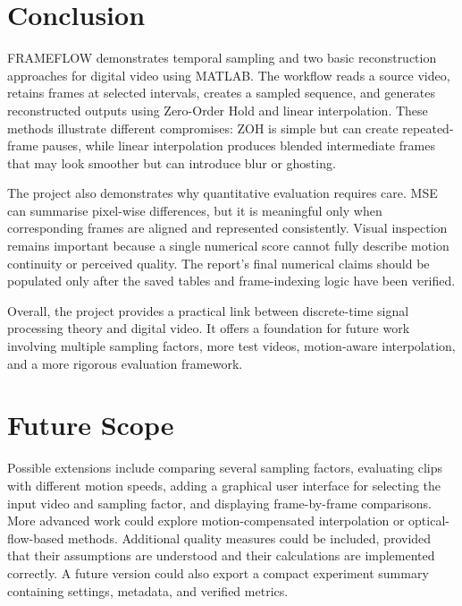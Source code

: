 \documentclass[12pt,a4paper,oneside]{report}
\begin{document}
\chapter{Conclusion}
FRAMEFLOW demonstrates temporal sampling and two basic reconstruction approaches for digital video using MATLAB. The workflow reads a source video, retains frames at selected intervals, creates a sampled sequence, and generates reconstructed outputs using Zero-Order Hold and linear interpolation. These methods illustrate different compromises: ZOH is simple but can create repeated-frame pauses, while linear interpolation produces blended intermediate frames that may look smoother but can introduce blur or ghosting.

The project also demonstrates why quantitative evaluation requires care. MSE can summarise pixel-wise differences, but it is meaningful only when corresponding frames are aligned and represented consistently. Visual inspection remains important because a single numerical score cannot fully describe motion continuity or perceived quality. The report's final numerical claims should be populated only after the saved tables and frame-indexing logic have been verified.

Overall, the project provides a practical link between discrete-time signal processing theory and digital video. It offers a foundation for future work involving multiple sampling factors, more test videos, motion-aware interpolation, and a more rigorous evaluation framework.

\chapter{Future Scope}
Possible extensions include comparing several sampling factors, evaluating clips with different motion speeds, adding a graphical user interface for selecting the input video and sampling factor, and displaying frame-by-frame comparisons. More advanced work could explore motion-compensated interpolation or optical-flow-based methods. Additional quality measures could be included, provided that their assumptions are understood and their calculations are implemented correctly. A future version could also export a compact experiment summary containing settings, metadata, and verified metrics.
\end{document}
